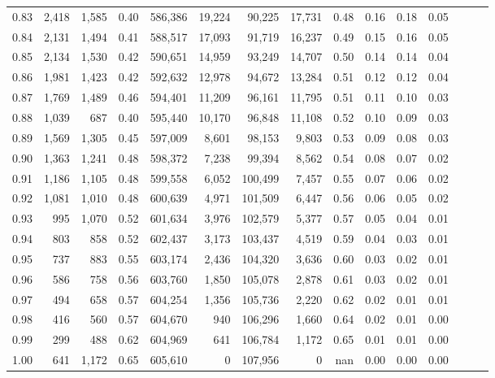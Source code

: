 \begin{tabular}{rrrrrrrrrrrrrrr}
0.83 &   2,418 &  1,585 &  0.40 &  586,386 &   19,224 &   90,225 &   17,731 &  0.48 &  0.16 &  0.18 &      0.05 \\
0.84 &   2,131 &  1,494 &  0.41 &  588,517 &   17,093 &   91,719 &   16,237 &  0.49 &  0.15 &  0.16 &      0.05 \\
0.85 &   2,134 &  1,530 &  0.42 &  590,651 &   14,959 &   93,249 &   14,707 &  0.50 &  0.14 &  0.14 &      0.04 \\
0.86 &   1,981 &  1,423 &  0.42 &  592,632 &   12,978 &   94,672 &   13,284 &  0.51 &  0.12 &  0.12 &      0.04 \\
0.87 &   1,769 &  1,489 &  0.46 &  594,401 &   11,209 &   96,161 &   11,795 &  0.51 &  0.11 &  0.10 &      0.03 \\
0.88 &   1,039 &    687 &  0.40 &  595,440 &   10,170 &   96,848 &   11,108 &  0.52 &  0.10 &  0.09 &      0.03 \\
0.89 &   1,569 &  1,305 &  0.45 &  597,009 &    8,601 &   98,153 &    9,803 &  0.53 &  0.09 &  0.08 &      0.03 \\
0.90 &   1,363 &  1,241 &  0.48 &  598,372 &    7,238 &   99,394 &    8,562 &  0.54 &  0.08 &  0.07 &      0.02 \\
0.91 &   1,186 &  1,105 &  0.48 &  599,558 &    6,052 &  100,499 &    7,457 &  0.55 &  0.07 &  0.06 &      0.02 \\
0.92 &   1,081 &  1,010 &  0.48 &  600,639 &    4,971 &  101,509 &    6,447 &  0.56 &  0.06 &  0.05 &      0.02 \\
0.93 &     995 &  1,070 &  0.52 &  601,634 &    3,976 &  102,579 &    5,377 &  0.57 &  0.05 &  0.04 &      0.01 \\
0.94 &     803 &    858 &  0.52 &  602,437 &    3,173 &  103,437 &    4,519 &  0.59 &  0.04 &  0.03 &      0.01 \\
0.95 &     737 &    883 &  0.55 &  603,174 &    2,436 &  104,320 &    3,636 &  0.60 &  0.03 &  0.02 &      0.01 \\
0.96 &     586 &    758 &  0.56 &  603,760 &    1,850 &  105,078 &    2,878 &  0.61 &  0.03 &  0.02 &      0.01 \\
0.97 &     494 &    658 &  0.57 &  604,254 &    1,356 &  105,736 &    2,220 &  0.62 &  0.02 &  0.01 &      0.01 \\
0.98 &     416 &    560 &  0.57 &  604,670 &      940 &  106,296 &    1,660 &  0.64 &  0.02 &  0.01 &      0.00 \\
0.99 &     299 &    488 &  0.62 &  604,969 &      641 &  106,784 &    1,172 &  0.65 &  0.01 &  0.01 &      0.00 \\
1.00 &     641 &  1,172 &  0.65 &  605,610 &        0 &  107,956 &        0 &   nan &  0.00 &  0.00 &      0.00 \\
\bottomrule
\end{tabular}
